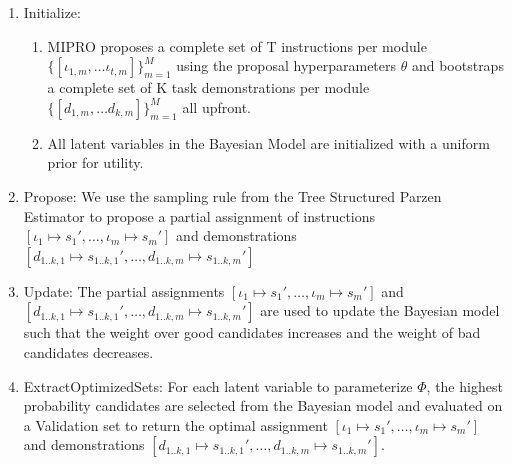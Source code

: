 \begin{enumerate}
    \item Initialize:
    \begin{enumerate}
        \item MIPRO proposes a complete set of T instructions per module $\{[\iota_{1,m}, \ldots \iota_{t,m}]\}_{m=1}^{M}$ using the proposal hyperparameters $\theta$ and bootstraps a complete set of K task demonstrations per module $\{[d_{1,m}, \ldots d_{k,m}]\}_{m=1}^{M}$ all upfront.
        \item All latent variables in the Bayesian Model are initialized with a uniform prior for utility.
    \end{enumerate}
    \item Propose: We use the sampling rule from the Tree Structured Parzen Estimator \citep{bergstra2011algorithms} to propose a partial assignment of instructions $[\iota_{1} \mapsto s_{1}', \ldots, \iota_{m} \mapsto s_{m}']$ and demonstrations $[d_{1..k,1} \mapsto s_{1..k,1}', \ldots, d_{1..k,m} \mapsto s_{1..k,m}']$
    \item Update: The partial assignments $[\iota_{1} \mapsto s_{1}', \ldots, \iota_{m} \mapsto s_{m}']$ and $[d_{1..k,1} \mapsto s_{1..k,1}', \ldots, d_{1..k,m} \mapsto s_{1..k,m}']$ are used to update the Bayesian model such that the weight over good candidates increases and the weight of bad candidates decreases.
    \item ExtractOptimizedSets: For each latent variable to parameterize $\Phi$, the highest probability candidates are selected from the Bayesian model and evaluated on a Validation set to return the optimal assignment $[\iota_{1} \mapsto s_{1}', \ldots, \iota_{m} \mapsto s_{m}']$ and demonstrations $[d_{1..k,1} \mapsto s_{1..k,1}', \ldots, d_{1..k,m} \mapsto s_{1..k,m}']$.
\end{enumerate}
